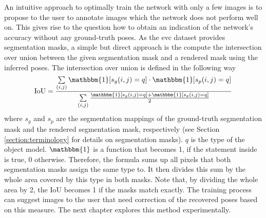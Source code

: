 An intuitive approach to optimally train the network with only a few images is to propose to the user to annotate images which the network does not perform well on. This gives rise to the question how to obtain an indication of the network's accuracy without any ground-truth poses. As the \ac{evc} dataset provides segmentation masks, a simple but direct approach is the compute the intersection over union between the given segmentation mask and a rendered mask using the inferred poses. The intersection over union is defined in the following way
\begin{align*}
\text{IoU} = \frac{\sum\limits_{(i, j)} \mathbbm{1}[s_g(i, j) = q] \cdot  \mathbbm{1}[s_p(i, j) = q]}{\sum\limits_{(i, j)} \frac{\mathbbm{1}[s_g(i, j) = q] +  \mathbbm{1}[s_p(i, j) = q]}{2}}
\end{align*}
where $s_g$ and $s_p$ are the segmentation mappings of the ground-truth segmentation mask and the rendered segmentation mask, respectively (see Section \ref{section:terminology} for details on segmentation masks). $q$ is the type of the object model. $\mathbbm{1}$ is a function that becomes 1, if the statement inside is true, 0 otherwise. Therefore, the formula sums up all pixels that both segmentation masks assign the same type to. It then divides this sum by the whole area covered by this type in both masks. Note that, by dividing the whole area by 2, the $\text{IoU}$ becomes 1 if the masks match exactly. The training process can suggest images to the user that need correction of the recovered poses based on this measure. The next chapter explores this method experimentally.